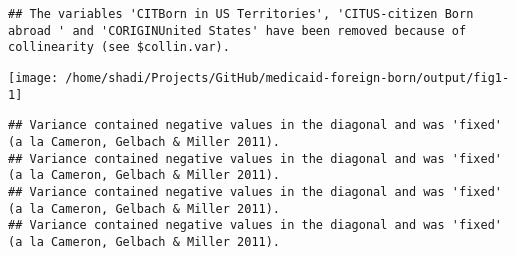 \documentclass[
]{article}
\begin{document}
\begin{verbatim}
## The variables 'CITBorn in US Territories', 'CITUS-citizen Born abroad ' and 'CORIGINUnited States' have been removed because of collinearity (see $collin.var).
\end{verbatim}

\begin{center}\texttt{[image: /home/shadi/Projects/GitHub/medicaid-foreign-born/output/fig1-1]} \end{center}
\FloatBarrier

\begin{verbatim}
## Variance contained negative values in the diagonal and was 'fixed' (a la Cameron, Gelbach & Miller 2011).
## Variance contained negative values in the diagonal and was 'fixed' (a la Cameron, Gelbach & Miller 2011).
## Variance contained negative values in the diagonal and was 'fixed' (a la Cameron, Gelbach & Miller 2011).
## Variance contained negative values in the diagonal and was 'fixed' (a la Cameron, Gelbach & Miller 2011).
\end{verbatim}
\end{document}
